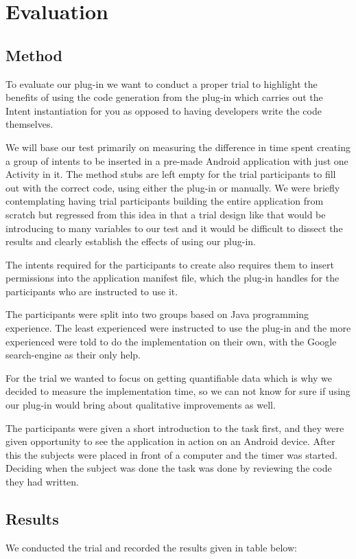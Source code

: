 \section{Evaluation}
\subsection{Method}
To evaluate our plug-in we want to conduct a proper trial to highlight the benefits of using the code generation from the plug-in which carries out the Intent instantiation for you as opposed to having developers write the code themselves.

We will base our test primarily on measuring the difference in time spent creating a group of intents to be inserted in a pre-made Android application with just one Activity in it. The method stubs are left empty for the trial participants to fill out with the correct code, using either the plug-in or manually. We were briefly contemplating having trial participants building the entire application from scratch but regressed from this idea in that a trial design like that would be introducing to many variables to our test and it would be difficult to dissect the results and clearly establish the effects of using our plug-in.

The intents required for the participants to create also requires them to insert permissions into the application manifest file, which the plug-in handles for the participants who are instructed to use it.

The participants were split into two groups based on Java programming experience. The least experienced were instructed to use the plug-in and the more experienced were told to do the implementation on their own, with the Google search-engine as their only help.

For the trial we wanted to focus on getting quantifiable data which is why we decided to measure the implementation time, so we can not know for sure if using our plug-in would bring about qualitative improvements as well.

The participants were given a short introduction to the task first, and they were given opportunity to see the application in action on an Android device. After this the subjects were placed in front of a computer and the timer was started. Deciding when the subject was done the task was done by reviewing the code they had written.


\subsection{Results}
We conducted the trial and recorded the results given in table below:
 

